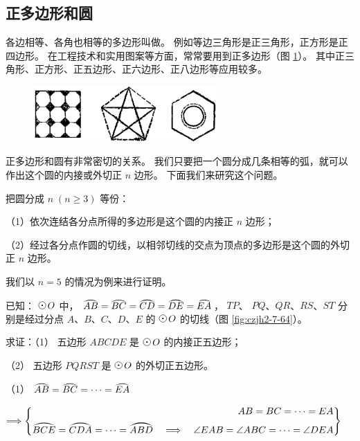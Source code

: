 \subsection{正多边形和圆}\label{subsec:czjh2-7-16}

各边相等、各角也相等的多边形叫做。
例如等边三角形是正三角形，正方形是正四边形。
在工程技术和实用图案等方面，常常要用到正多边形（图 \ref{fig:czjh2-7-63}）。
其中正三角形、正方形、正五边形、正六边形、正八边形等应用较多。

\begin{figure}[htbp]
    \centering
    \includegraphics[width=7cm]{../pic/czjh2-ch7-63.png}
    \caption{}\label{fig:czjh2-7-63}
\end{figure}


正多边形和圆有非常密切的关系。
我们只要把一个圆分成几条相等的弧，就可以作出这个圆的内接或外切正 $n$ 边形。
下面我们来研究这个问题。

\begin{dingli}[定理]
    把圆分成 $n \; (n \geqslant 3)$ 等份：

    （1）依次连结各分点所得的多边形是这个圆的内接正 $n$ 边形；

    （2）经过各分点作圆的切线，以相邻切线的交点为顶点的多边形是这个圆的外切正 $n$ 边形。

\end{dingli}

我们以 $n = 5$ 的情况为例来进行证明。

已知： $\yuan\,O$ 中， $\yuanhu{AB} = \yuanhu{BC} = \yuanhu{CD} = \yuanhu{DE} = \yuanhu{EA}$，
$TP$、 $PQ$、$QR$、$RS$、$ST$ 分别是经过分点 $A$、$B$、$C$、$D$、$E$ 的 $\yuan\,O$ 的切线（图 \ref{fig:czjh2-7-64}）。

求证：（1） 五边形 $ABCDE$ 是 $\yuan\,O$ 的内接正五边形；

（2） 五边形 $PQRST$ 是 $\yuan\,O$ 的外切正五边形。

\zhengming

（1） $\yuanhu{AB} = \yuanhu{BC} = \cdots = \yuanhu{EA}$

\quad $\tuichu \left\{\begin{aligned}
    AB = BC = \cdots = EA \\
    \yuanhu{BCE} = \yuanhu{CDA} = \cdots = \yuanhu{ABD} \quad \tuichu \quad \angle EAB = \angle ABC = \cdots = \angle DEA
\end{aligned}\right\}$

